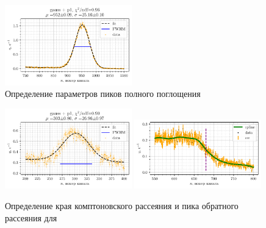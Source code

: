 \begin{figure}[h!]
    \centering
    \includegraphics[width=0.49\textwidth]{figures/cs_p1.pdf}
    \vspace{-2mm}
    \caption{Определение параметров пиков полного поглощения \cs}
\end{figure}



\begin{figure}[h!]
    \centering
    \includegraphics[width=0.49\textwidth]{figures/cs_bp1.pdf}
    \includegraphics[width=0.49\textwidth]{figures/cs_comp1.pdf}
    \vspace{-2mm}
    \caption{Определение края комптоновского рассеяния и пика обратного рассеяния для \cs}
\end{figure}









